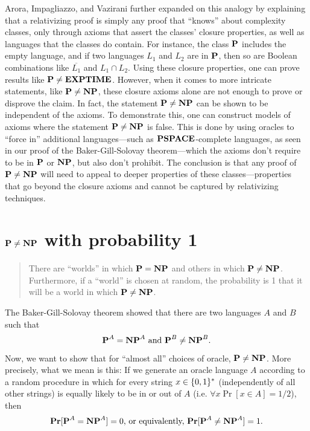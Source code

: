 Arora, Impagliazzo, and Vazirani further expanded on this analogy by explaining that a relativizing proof is simply any proof that ``knows'' about complexity classes, only through axioms that assert the classes' closure properties, as well as languages that the classes do contain. For instance, the class $\textbf{P}$ includes the empty language, and if two languages $L_1$ and $L_2$ are in $\textbf{P}$, then so are Boolean combinations like $\overline{L_1}$ and $L_1 \cap L_2$. Using these closure properties, one can prove results like $\textbf{P} \neq \textbf{EXPTIME}$. However, when it comes to more intricate statements, like $\textbf{P} \neq \textbf{NP}$, these closure axioms alone are not enough to prove or disprove the claim. In fact, the statement $\textbf{P} \neq \textbf{NP}$ can be shown to be independent of the axioms. To demonstrate this, one can construct models of axioms where the statement $\textbf{P} \neq \textbf{NP}$ is false. This is done by using oracles to ``force in'' additional languages—such as $\textbf{PSPACE}$-complete languages, as seen in our proof of the Baker-Gill-Solovay theorem—which the axioms don't require to be in $\textbf{P}$ or $\textbf{NP}$, but also don't prohibit. The conclusion is that any proof of $\textbf{P} \neq \textbf{NP}$ will need to appeal to deeper properties of these classes—properties that go beyond the closure axioms and cannot be captured by relativizing techniques.

\section{$\textbf{P} \neq \textbf{NP}$ with probability 1}
\begin{quote}
  There are ``worlds'' in which $\textbf{P} = \textbf{NP}$ and others in which $\textbf{P} \neq \textbf{NP}$. Furthermore, if a ``world'' is chosen at random, the probability is 1 that it will be a world in which $\textbf{P} \neq \textbf{NP}$.
\end{quote}

The Baker-Gill-Solovay theorem showed that there are two languages $A$ and $B$ such that
\[ \text{$\textbf{P}^A = \textbf{NP}^A$ and $\textbf{P}^B \neq \textbf{NP}^B$.}\]
Now, we want to show that for ``almost all'' choices of oracle, $\textbf{P} \neq \textbf{NP}$. More precisely, what we mean is this: If we generate an oracle language $A$ according to a random procedure in which for every string $x \in \{ 0, 1 \}^\ast$ (independently of all other strings) is equally likely to be in or out of $A$ (i.e. $\forall x \Pr[x \in A] = 1/2$), then
\[ \text{$\textbf{Pr}[\textbf{P}^A = \textbf{NP}^A] = 0$, or equivalently, $\textbf{Pr}[\textbf{P}^A \neq \textbf{NP}^A] = 1$.} \]

